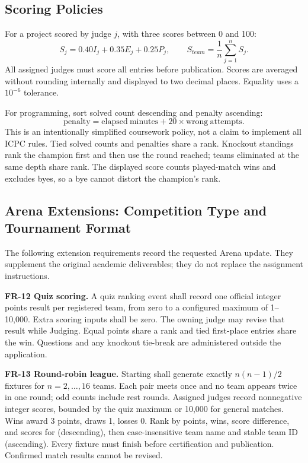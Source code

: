\documentclass[12pt]{article}
\begin{document}
\subsection*{Scoring Policies}
For a project scored by judge $j$, with three scores between 0 and 100:
\[S_j=0.40I_j+0.35E_j+0.25P_j,\qquad S_{team}=\frac{1}{n}\sum_{j=1}^{n}S_j.\]
All assigned judges must score all entries before publication. Scores are averaged without rounding internally and displayed to two decimal places. Equality uses a $10^{-6}$ tolerance.

For programming, sort solved count descending and penalty ascending:
\[\mathrm{penalty}=\mathrm{elapsed\ minutes}+20\times\mathrm{wrong\ attempts}.\]
This is an intentionally simplified coursework policy, not a claim to implement all ICPC rules. Tied solved counts and penalties share a rank. Knockout standings rank the champion first and then use the round reached; teams eliminated at the same depth share rank. The displayed score counts played-match wins and excludes byes, so a bye cannot distort the champion's rank.

\subsection{Arena Extensions: Competition Type and Tournament Format}
The following extension requirements record the requested Arena update. They supplement the original academic deliverables; they do not replace the assignment instructions.

\textbf{FR-12 Quiz scoring.} A quiz ranking event shall record one official integer points result per registered team, from zero to a configured maximum of 1--10,000. Extra scoring inputs shall be zero. The owning judge may revise that result while Judging. Equal points share a rank and tied first-place entries share the win. Questions and any knockout tie-break are administered outside the application.

\textbf{FR-13 Round-robin league.} Starting shall generate exactly $n(n-1)/2$ fixtures for $n=2,\ldots,16$ teams. Each pair meets once and no team appears twice in one round; odd counts include rest rounds. Assigned judges record nonnegative integer scores, bounded by the quiz maximum or 10,000 for general matches. Wins award 3 points, draws 1, losses 0. Rank by points, wins, score difference, and scores for (descending), then case-insensitive team name and stable team ID (ascending). Every fixture must finish before certification and publication. Confirmed match results cannot be revised.
\end{document}
